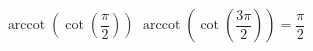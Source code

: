 {$\operatorname{arccot}\left(\cot\left(\dfrac{\pi}{2}\right) \right)$} 
{ $\operatorname{arccot}\left(\cot\left(\dfrac{3\pi}{2}\right) \right) = \dfrac{\pi}{2}$}
